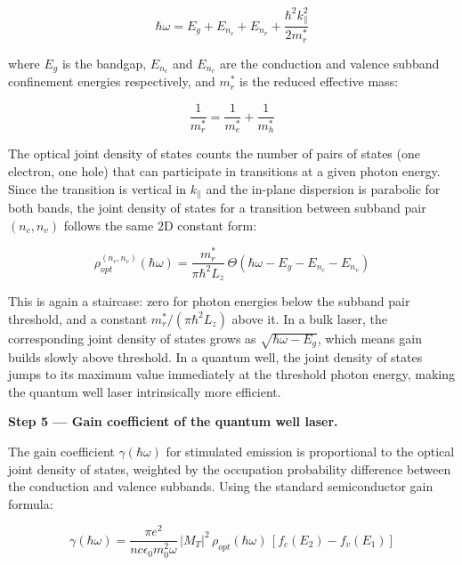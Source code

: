 \begin{equation*}
  \hbar\omega = E_g + E_{n_c} + E_{n_v} + \frac{\hbar^2 k_\parallel^2}{2m_r^*}
\end{equation*}

where $E_g$ is the bandgap, $E_{n_c}$ and $E_{n_v}$ are the conduction and valence subband confinement energies respectively, and $m_r^*$ is the reduced effective mass:

\begin{equation*}
  \frac{1}{m_r^*} = \frac{1}{m_e^*} + \frac{1}{m_h^*}
\end{equation*}

The optical joint density of states counts the number of pairs of states (one electron, one hole) that can participate in transitions at a given photon energy. Since the transition is vertical in $k_\parallel$ and the in-plane dispersion is parabolic for both bands, the joint density of states for a transition between subband pair $(n_c, n_v)$ follows the same 2D constant form:

\begin{equation*}
  \boxed{\rho_{opt}^{(n_c, n_v)}(\hbar\omega) = \frac{m_r^*}{\pi\hbar^2 L_z}\,\Theta\!\left(\hbar\omega - E_g - E_{n_c} - E_{n_v}\right)}
\end{equation*}

This is again a staircase: zero for photon energies below the subband pair threshold, and a constant $m_r^*/(\pi\hbar^2 L_z)$ above it. In a bulk laser, the corresponding joint density of states grows as $\sqrt{\hbar\omega - E_g}$, which means gain builds slowly above threshold. In a quantum well, the joint density of states jumps to its maximum value immediately at the threshold photon energy, making the quantum well laser intrinsically more efficient.

\textbf{Step 5 — Gain coefficient of the quantum well laser.}

The gain coefficient $\gamma(\hbar\omega)$ for stimulated emission is proportional to the optical joint density of states, weighted by the occupation probability difference between the conduction and valence subbands. Using the standard semiconductor gain formula:

\begin{equation*}
  \gamma(\hbar\omega) = \frac{\pi e^2}{n c \epsilon_0 m_0^2 \omega}\,|M_T|^2\,\rho_{opt}(\hbar\omega)\,\left[f_c(E_2) - f_v(E_1)\right]
\end{equation*}


